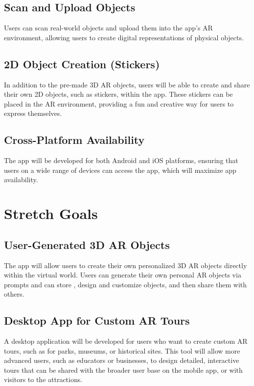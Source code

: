 \documentclass{article}
\begin{document}
\subsection{Scan and Upload Objects}
Users can scan real-world objects and upload them into the app’s AR environment, allowing users to create digital representations of physical objects.

\subsection{2D Object Creation (Stickers)}
In addition to the pre-made 3D AR objects, users will be able to create and share their own 2D objects, such as stickers, within the app. These stickers can be placed in the AR environment, providing a fun and creative way for users to express themselves.

\subsection{Cross-Platform Availability}
The app will be developed for both Android and iOS platforms, ensuring that users on a wide range of devices can access the app, which will maximize app availability.

\section{Stretch Goals}

\subsection{User-Generated 3D AR Objects}
The app will allow users to create their own personalized 3D AR objects directly within the virtual world. Users can generate their own personal AR objects via prompts and can store , design and customize objects, and then share them with others.

\subsection{Desktop App for Custom AR Tours}
A desktop application will be developed for users who want to create custom AR tours, such as for parks, museums, or historical sites. This tool will allow more advanced users, such as educators or businesses, to design detailed, interactive tours that can be shared with the broader user base on the mobile app, or with visitors to the attractions.
\end{document}

